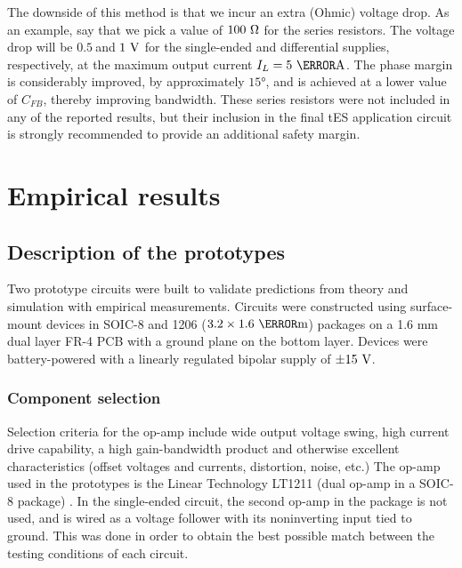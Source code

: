 \documentclass[10pt]{article}
\begin{document}
The downside of this method is that we incur an extra (Ohmic) voltage drop. As an example, say that we pick a value of $100~\ohm$ for the series resistors. The voltage drop will be $0.5~$and $1~\volt$ for the single-ended and differential supplies, respectively, at the maximum output current $I_L=5~\milli\ampere$. The phase margin is considerably improved, by approximately $\ang{15}$, and is achieved at a lower value of $C_{FB}$, thereby improving bandwidth. These series resistors were not included in any of the reported results, but their inclusion in the final tES application circuit is strongly recommended to provide an additional safety margin.



\section{Empirical results}
\label{sec:empirical-results}

\subsection{Description of the prototypes}
\label{sec:description_of_the_prototype}

Two prototype circuits were built to validate predictions from theory and simulation with empirical measurements. Circuits were constructed using surface-mount devices in SOIC-8 and 1206 ($3.2\times1.6~\milli\meter$) packages on a 1.6 mm dual layer FR-4 PCB with a ground plane on the bottom layer. Devices were battery-powered with a linearly regulated bipolar supply of $\pm15~\volt$.

\subsubsection{Component selection}

Selection criteria for the op-amp include wide output voltage swing, high current drive capability, a high gain-bandwidth product and otherwise excellent characteristics (offset voltages and currents, distortion, noise, etc.) The op-amp used in the prototypes is the Linear Technology LT1211 (dual op-amp in a SOIC-8 package) \cite{LT1211_datasheet}. In the single-ended circuit, the second op-amp in the package is not used, and is wired as a voltage follower with its noninverting input tied to ground. This was done in order to obtain the best possible match between the testing conditions of each circuit.
\end{document}

